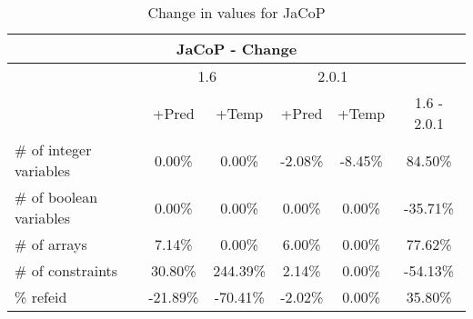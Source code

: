 \documentclass{standalone}
\begin{document}
\begin{table}[H]
\footnotesize
\centering
\begin{tabular}{lc|c|c|c|c}
\multicolumn{6}{c}{JaCoP - Change} \\ 
\hline\hline  & \multicolumn{2}{c|}{1.6} &\multicolumn{2}{c|}{2.0.1} &\\ 
\hline  & +Pred & +Temp & +Pred & +Temp & 1.6 - 2.0.1\\
\# of integer variables & 0.00\% & 0.00\% & -2.08\% & -8.45\% & 84.50\% \\ 
\# of boolean variables & 0.00\% & 0.00\% & 0.00\% & 0.00\% & -35.71\% \\
\# of arrays            & 7.14\% & 0.00\% & 6.00\% & 0.00\% & 77.62\% \\
\# of constraints       & 30.80\% & 244.39\% & 2.14\% & 0.00\% & -54.13\% \\ 
\% refeid               & -21.89\% & -70.41\% & -2.02\% & 0.00\% & 35.80\%\\ 
\end{tabular}\caption{Change in values for JaCoP}
\end{table}
\end{document}
